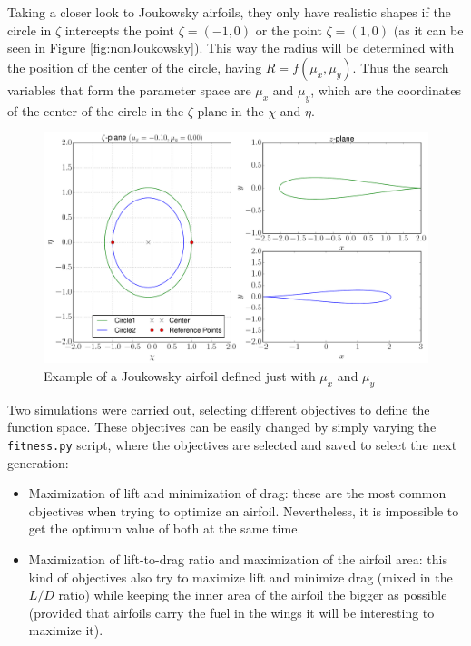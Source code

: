 \newpage

Taking a closer look to Joukowsky airfoils, they only have realistic shapes if the circle in $\zeta$ intercepts the point $\zeta = (-1,0)$ or the point $\zeta = (1,0)$ (as it can be seen in Figure \ref{fig:nonJoukowsky}). This way the radius will be determined with the position of the center of the circle, having $R=f(\mu_x,\mu_y)$. Thus the search variables that form the parameter space are $\mu_x$ and $\mu_y$, which are the coordinates of the center of the circle in the $\zeta$ plane in the $\chi$ and $\eta$.

     \begin{figure}[h!]
        \centering
        \includegraphics[width=\textwidth]{Figures/3/J_0.pdf}
        \caption{Example of a Joukowsky airfoil defined just with $\mu_x$ and $\mu_y$}
        \label{fig:joukowskyTheory}
    \end{figure}
    
Two simulations were carried out, selecting different objectives to define the function space. These objectives can be easily changed by simply varying the \texttt{fitness.py} script, where the objectives are selected and saved to select the next generation:

\begin{itemize}
    \item Maximization of lift and minimization of drag: these are the most common objectives when trying to optimize an airfoil. Nevertheless, it is impossible to get the optimum value of both at the same time.
    \item Maximization of lift-to-drag ratio and maximization of the airfoil area: this kind of objectives also try to maximize lift and minimize drag (mixed in the $L/D$ ratio) while keeping the inner area of the airfoil the bigger as possible (provided that airfoils carry the fuel in the wings it will be interesting to maximize it). 
\end{itemize}

